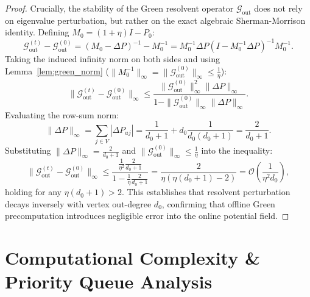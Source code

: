 \documentclass[11pt,a4paper]{article}
\begin{document}
\begin{proof}
Crucially, the stability of the Green resolvent operator $\mathcal{G}_{\text{out}}$ does not rely on eigenvalue perturbation, but rather on the exact algebraic Sherman-Morrison identity. Defining $M_0 = (1 + \eta)I - P_0$:
\begin{equation}
\mathcal{G}_{\text{out}}^{(t)} - \mathcal{G}_{\text{out}}^{(0)} = \left( M_0 - \Delta P \right)^{-1} - M_0^{-1} = M_0^{-1} \Delta P \left( I - M_0^{-1} \Delta P \right)^{-1} M_0^{-1}.
\end{equation}
Taking the induced infinity norm on both sides and using Lemma~\ref{lem:green_norm} ($\|M_0^{-1}\|_\infty = \|\mathcal{G}_{\text{out}}^{(0)}\|_\infty \le \frac{1}{\eta}$):
\begin{equation}
\|\mathcal{G}_{\text{out}}^{(t)} - \mathcal{G}_{\text{out}}^{(0)}\|_\infty \le \frac{\|\mathcal{G}_{\text{out}}^{(0)}\|_\infty^2 \|\Delta P\|_\infty}{1 - \|\mathcal{G}_{\text{out}}^{(0)}\|_\infty \|\Delta P\|_\infty}.
\end{equation}
Evaluating the row-sum norm:
\begin{equation}
\|\Delta P\|_\infty = \sum_{j \in V} |\Delta P_{uj}| = \frac{1}{d_0 + 1} + d_0 \frac{1}{d_0 (d_0 + 1)} = \frac{2}{d_0 + 1}.
\end{equation}
Substituting $\|\Delta P\|_\infty = \frac{2}{d_0 + 1}$ and $\|\mathcal{G}_{\text{out}}^{(0)}\|_\infty \le \frac{1}{\eta}$ into the inequality:
\begin{equation}
\|\mathcal{G}_{\text{out}}^{(t)} - \mathcal{G}_{\text{out}}^{(0)}\|_\infty \le \frac{\frac{1}{\eta^2} \frac{2}{d_0 + 1}}{1 - \frac{1}{\eta} \frac{2}{d_0 + 1}} = \frac{2}{\eta \left( \eta(d_0 + 1) - 2 \right)} = \mathcal{O}\left( \frac{1}{\eta^2 d_0} \right),
\end{equation}
holding for any $\eta(d_0 + 1) > 2$. This establishes that resolvent perturbation decays inversely with vertex out-degree $d_0$, confirming that offline Green precomputation introduces negligible error into the online potential field.
\end{proof}

\section{Computational Complexity \& Priority Queue Analysis}
\label{sec:appendix_complexity}
\end{document}
